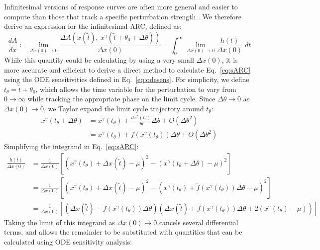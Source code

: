 \documentclass[11pt, letterpaper]{article}
\begin{document}
Infinitesimal versions of response curves are often more general and easier to compute than those that track a specific perturbation strength \cite{Rand2004}.
We therefore derive an expression for the infinitesimal ARC, defined as:
\begin{equation}
  \frac{dA}{dx} \coloneqq \lim_{\Delta x(0) \to 0} \frac{\Delta A\left(x(\tilde{t}),\ x^\gamma(\tilde{t} + \theta_0 + \Delta\theta)\right)}{\Delta x(0)} = \int_0^\infty \lim_{\Delta x(0) \to 0} \frac{h(t)}{\Delta x(0)} \; dt
  \label{eq:sARC}
\end{equation}
While this quantity could be calculating by using a very small $\Delta x(0)$, it is more accurate and efficient to derive a direct method to calculate Eq.~\ref{eq:sARC} using the ODE sensitivities defined in Eq.~\ref{eq:odesens}.
For simplicity, we define $t_\theta = \tilde{t} + \theta_0$, which allows the time variable for the perturbation to vary from $0 \to \infty$ while tracking the appropriate phase on the limit cycle.
Since $\Delta \theta \to 0$ as $\Delta x(0) \to 0$, we Taylor expand the limit cycle trajectory around $t_\theta$:
\begin{align}
  x^\gamma(t_\theta + \Delta\theta) &= x^\gamma(t_\theta) +
  \frac{dx^\gamma(t_\theta)}{d\theta}\Delta\theta + O(\Delta\theta^2)\\
  &= x^\gamma(t_\theta) + \tilde{f}\left(x^\gamma(t_\theta)\right)\Delta\theta +
  O(\Delta\theta^2)
\end{align}
Simplifying the integrand in Eq.~\ref{eq:sARC}:
\begin{align}
  \frac{h(t)}{\Delta x(0)} &= \frac{1}{\Delta x(0)} \left[\left(x^\gamma(t_\theta) +
    \Delta x(\tilde{t}) - \mu\right)^2 - \left(x^\gamma(t_\theta +
    \Delta \theta) - \mu\right)^2 \right]\\
  &= \frac{1}{\Delta x(0)} \left[\left(x^\gamma(t_\theta) +
    \Delta x(\tilde{t}) - \mu\right)^2 - \left(x^\gamma(t_\theta) + \tilde{f}\left(x^\gamma(t_\theta)\right)\Delta\theta - \mu\right)^2 \right]\\
  &= \frac{1}{\Delta x(0)} \left[\left(\Delta x(\tilde{t}) -
    \tilde{f}\left(x^\gamma(t_\theta)\right)\Delta\theta\right) \left(\Delta
    x(\tilde{t}) + \tilde{f}\left(x^\gamma(t_\theta)\right)\Delta\theta +
    2(x^\gamma(t_\theta) - \mu)\right) \right]
\end{align}
Taking the limit of this integrand as $\Delta x(0) \to 0$ cancels several differential terms, and allows the remainder to be substituted with quantities that can be calculated using ODE sensitivity analysis:
\end{document}
